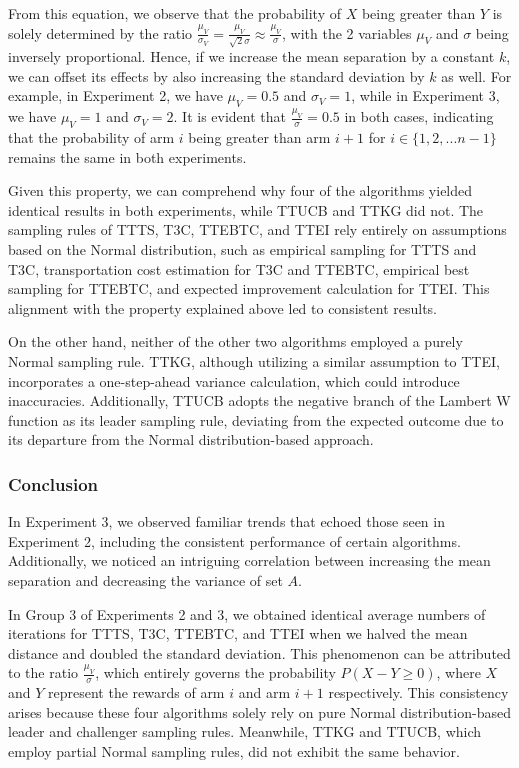 \documentclass[a4paper, 12pt]{article}
\theoremstyle{definition}
\begin{document}
From this equation, we observe that the probability of $X$ being greater than $Y$ is solely determined by the ratio $\frac{\mu_V}{\sigma_V} = \frac{\mu_V}{\sqrt{2}\sigma} \approx \frac{\mu_V}{\sigma}$, with the 2 variables $\mu_V$ and $\sigma$ being inversely proportional. Hence, if we increase the mean separation by a constant $k$, we can offset its effects by also increasing the standard deviation by $k$ as well. For example, in Experiment 2, we have $\mu_V = 0.5$ and $\sigma_V = 1$, while in Experiment 3, we have $\mu_V = 1$ and $\sigma_V = 2$. It is evident that $\frac{\mu_V}{\sigma} = 0.5$ in both cases, indicating that the probability of arm $i$ being greater than arm $i+1$ for $i\in \{1,2,...n-1\}$ remains the same in both experiments.

Given this property, we can comprehend why four of the algorithms yielded identical results in both experiments, while TTUCB and TTKG did not. The sampling rules of TTTS, T3C, TTEBTC, and TTEI rely entirely on assumptions based on the Normal distribution, such as empirical sampling for TTTS and T3C, transportation cost estimation for T3C and TTEBTC, empirical best sampling for TTEBTC, and expected improvement calculation for TTEI. This alignment with the property explained above led to consistent results. 

On the other hand, neither of the other two algorithms employed a purely Normal sampling rule. TTKG, although utilizing a similar assumption to TTEI, incorporates a one-step-ahead variance calculation, which could introduce inaccuracies. Additionally, TTUCB adopts the negative branch of the Lambert W function as its leader sampling rule, deviating from the expected outcome due to its departure from the Normal distribution-based approach.

\subsubsection{Conclusion}
In Experiment 3, we observed familiar trends that echoed those seen in Experiment 2, including the consistent performance of certain algorithms. Additionally, we noticed an intriguing correlation between increasing the mean separation and decreasing the variance of set $A$.

In Group 3 of Experiments 2 and 3, we obtained identical average numbers of iterations for TTTS, T3C, TTEBTC, and TTEI when we halved the mean distance and doubled the standard deviation. This phenomenon can be attributed to the ratio $\frac{\mu_V}{\sigma}$, which entirely governs the probability $P(X-Y \geq 0)$, where $X$ and $Y$ represent the rewards of arm $i$ and arm $i+1$ respectively. This consistency arises because these four algorithms solely rely on pure Normal distribution-based leader and challenger sampling rules. Meanwhile, TTKG and TTUCB, which employ partial Normal sampling rules, did not exhibit the same behavior.
\end{document}
